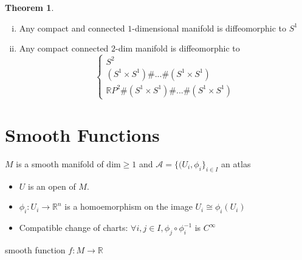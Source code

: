 \documentclass[]{book}
\theoremstyle{definition}
\theoremstyle{definition}
\theoremstyle{definition}
\newtheorem{thm}{Theorem}[section]
\theoremstyle{definition}
\theoremstyle{definition}
\theoremstyle{definition}
\theoremstyle{definition}
\theoremstyle{definition}
\theoremstyle{definition}
\theoremstyle{definition}
\theoremstyle{definition}
\newcommand{\R}{\mathbb{R}}
\begin{document}
   \begin{thm}
     \begin{enumerate}[i)]
       \item Any compact and connected $1$-dimensional manifold is diffeomorphic to $S^{1}$ 
       \item Any compact connected $2$-dim manifold is diffeomorphic to
         \[
             \left\{
                \begin{array}{ll}
                  S^{2}\\
                  (S^{1}\times S^{1})\#...\#(S^{1}\times S^{1}) \\
                  \R P^2  \# (S^{1}\times S^{1})\#...\#(S^{1}\times S^{1})
                \end{array}
             \right.
         \] 
     \end{enumerate}
   \end{thm}
   \section{Smooth Functions}
   $M$ is a smooth manifold of $\text{dim} \geq 1$ and $\mathcal{A}=\lbrace (U_{i},\phi_i \rbrace
   _{i\in I}$ an atlas
   \begin{itemize}
     \item $U$ is an open of $M$.
     \item $\phi_i:U_i\longrightarrow \R^{n}$ is a homoemorphism on the image $U_i \cong \phi_i(U_i)$ 
     \item Compatible change of charts: $\forall i,j \in I, \phi_j\circ \phi_i^{-1}$ is $C^{\infty}$
   \end{itemize}
   \begin{center}
   \end{center}
   
   smooth function $f:M\longrightarrow \R $ 
   \begin{center}
   \end{center}
\end{document}
